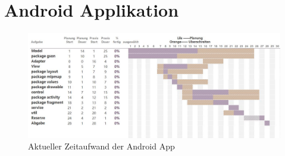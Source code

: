 \documentclass[a4paper]{scrreprt}
\begin{document}
        \section{Android Applikation}
        \begin{figure}[H]
                \centering
                \includegraphics[scale = 0.65]{aktuelleAndroidAppZeitplanung.jpg}
                \caption{Aktueller Zeitaufwand der Android App }
        \end{figure}
\end{document}
